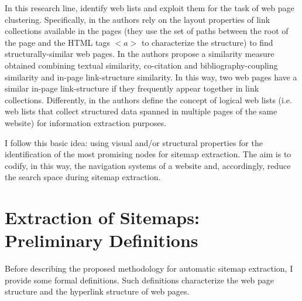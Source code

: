 In this research line, \cite{Crescenzi:2005, Lin:2010b} identify web lists and exploit them for the task of web page clustering. Specifically, in 
\cite{Crescenzi:2005} the authors rely on the layout properties of link collections available in the pages (they use the set of paths between the root of the page and the HTML tags $<a>$ to characterize the structure) to find structurally-similar web pages.
In  \cite{Lin:2010b} the  authors  propose a similarity measure obtained combining textual similarity, co-citation and bibliography-coupling similarity and in-page link-structure similarity.  In  this  way,  two  web  pages  have a similar in-page link-structure  if  they  frequently appear together in link collections. Differently, in \cite{Lanotte:2014} the authors define the concept of logical web lists (i.e. web lists that collect structured data spanned in multiple pages of the same website) for information extraction purposes.


I follow this basic idea: using visual and/or structural properties for the identification of the most promising nodes for sitemap extraction. The aim is to codify, in this way, the navigation systems of a website and, accordingly, reduce the search space during sitemap extraction.

\section{Extraction of Sitemaps: Preliminary Definitions}
\label{sec:extractionSitemaps}
Before describing the proposed methodology for automatic sitemap extraction, I provide some formal definitions. Such definitions characterize the web page structure and the hyperlink structure of web pages.

